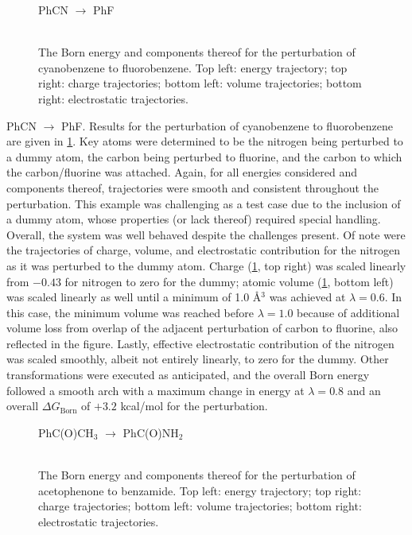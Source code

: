 \documentclass[12pt]{report}
\begin{document}
\begin{figure}[t!]
\centering
PhCN $\longrightarrow$ PhF\\
\hspace*{-1.3cm}\\
\hspace*{-1.3cm}
\caption{The Born energy and components thereof for the perturbation of cyanobenzene to fluorobenzene. Top left: energy trajectory; top right: charge trajectories; bottom left: volume trajectories; bottom right: electrostatic trajectories.}
\label{cnf}
\end{figure}

PhCN $\longrightarrow$ PhF. Results for the perturbation of cyanobenzene to fluorobenzene are given in \cref{cnf}. Key atoms were determined to be the nitrogen being perturbed to a dummy atom, the carbon being perturbed to fluorine, and the carbon to which the carbon/fluorine was attached. Again, for all energies considered and components thereof, trajectories were smooth and consistent throughout the perturbation. This example was challenging as a test case due to the inclusion of a dummy atom, whose properties (or lack thereof) required special handling. Overall, the system was well behaved despite the challenges present. Of note were the trajectories of charge, volume, and electrostatic contribution for the nitrogen as it was perturbed to the dummy atom. Charge (\cref{cnf}, top right) was scaled linearly from $-0.43$ for nitrogen to zero for the dummy; atomic volume (\cref{cnf}, bottom left) was scaled linearly as well until a minimum of 1.0 \AA$^{3}$ was achieved at $\lambda = 0.6$. In this case, the minimum volume was reached before $\lambda = 1.0$ because of additional volume loss from overlap of the adjacent perturbation of carbon to fluorine, also reflected in the figure. Lastly, effective electrostatic contribution of the nitrogen was scaled smoothly, albeit not entirely linearly, to zero for the dummy. Other transformations were executed as anticipated, and the overall Born energy followed a smooth arch with a maximum change in energy at $\lambda = 0.8$ and an overall $\Delta G_{ \textrm{Born}}$ of $+3.2$ kcal/mol for the perturbation.

\begin{figure}[t!]
\centering
PhC(O)CH$_3$  $\longrightarrow$ PhC(O)NH$_2$\\
\hspace*{-1.3cm}\\
\hspace*{-1.3cm}
\caption{The Born energy and components thereof for the perturbation of acetophenone to benzamide. Top left: energy trajectory; top right: charge trajectories; bottom left: volume trajectories; bottom right: electrostatic trajectories.}
\label{comenh2}
\end{figure}
\end{document}
